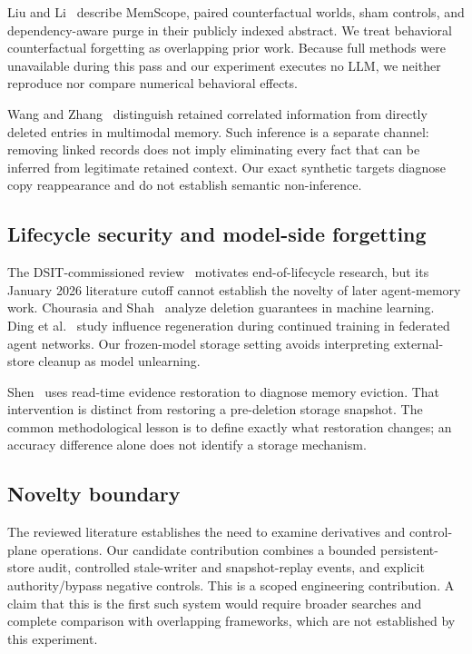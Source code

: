 ﻿\documentclass[sigconf,nonacm]{acmart}
\begin{document}
Liu and Li~\cite{liu2026} describe MemScope, paired counterfactual worlds, sham controls, and dependency-aware purge in their publicly indexed abstract. We treat behavioral counterfactual forgetting as overlapping prior work. Because full methods were unavailable during this pass and our experiment executes no LLM, we neither reproduce nor compare numerical behavioral effects.

Wang and Zhang~\cite{memleak2026} distinguish retained correlated information from directly deleted entries in multimodal memory. Such inference is a separate channel: removing linked records does not imply eliminating every fact that can be inferred from legitimate retained context. Our exact synthetic targets diagnose copy reappearance and do not establish semantic non-inference.

\subsection{Lifecycle security and model-side forgetting}
The DSIT-commissioned review~\cite{dsit2026} motivates end-of-lifecycle research, but its January 2026 literature cutoff cannot establish the novelty of later agent-memory work. Chourasia and Shah~\cite{chourasia2023} analyze deletion guarantees in machine learning. Ding et al.~\cite{ding2026} study influence regeneration during continued training in federated agent networks. Our frozen-model storage setting avoids interpreting external-store cleanup as model unlearning.

Shen~\cite{shen2026} uses read-time evidence restoration to diagnose memory eviction. That intervention is distinct from restoring a pre-deletion storage snapshot. The common methodological lesson is to define exactly what restoration changes; an accuracy difference alone does not identify a storage mechanism.

\subsection{Novelty boundary}
The reviewed literature establishes the need to examine derivatives and control-plane operations. Our candidate contribution combines a bounded persistent-store audit, controlled stale-writer and snapshot-replay events, and explicit authority/bypass negative controls. This is a scoped engineering contribution. A claim that this is the first such system would require broader searches and complete comparison with overlapping frameworks, which are not established by this experiment.
\end{document}

